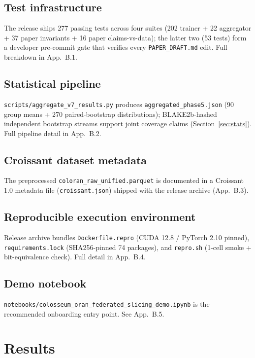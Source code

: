 \documentclass[journal]{IEEEtran}
\begin{document}
\subsection{Test infrastructure}

The release ships 277 passing tests across four suites (202 trainer + 22 aggregator + 37 paper invariants + 16 paper claims-vs-data); the latter two (53 tests) form a developer pre-commit gate that verifies every \lstinline|PAPER_DRAFT.md| edit. Full breakdown in App.~B.1.

\subsection{Statistical pipeline}

\lstinline|scripts/aggregate_v7_results.py| produces \lstinline|aggregated_phase5.json| (90 group means + 270 paired-bootstrap distributions); BLAKE2b-hashed independent bootstrap streams support joint coverage claims (Section~\ref{sec:stats}). Full pipeline detail in App.~B.2.

\subsection{Croissant dataset metadata}

The preprocessed \lstinline|coloran_raw_unified.parquet| is documented in a Croissant 1.0 metadata file (\lstinline|croissant.json|) shipped with the release archive (App.~B.3).

\subsection{Reproducible execution environment}

Release archive bundles \lstinline|Dockerfile.repro| (CUDA 12.8 / PyTorch 2.10 pinned), \lstinline|requirements.lock| (SHA256-pinned 74 packages), and \lstinline|repro.sh| (1-cell smoke + bit-equivalence check). Full detail in App.~B.4.

\subsection{Demo notebook}

\lstinline|notebooks/colosseum_oran_federated_slicing_demo.ipynb| is the recommended onboarding entry point. See App.~B.5.


\section{Results}\label{sec:results}
\end{document}
